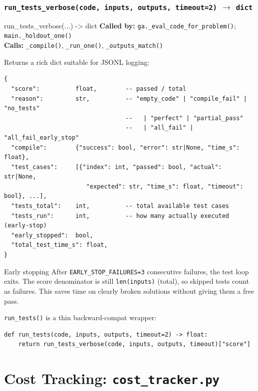 \documentclass[11pt,a4paper]{report}
\newcommand{\pyfile}[1]{\texttt{#1}}
\newcommand{\fn}[1]{\texttt{#1}}
\begin{document}
\subsection{\fn{run\_tests\_verbose(code, inputs, outputs, timeout=2)} $\to$ \fn{dict}}

\begin{specbox}{run\_tests\_verbose(...) -> dict}
\textbf{Called by:} \fn{ga.\_eval\_code\_for\_problem()}; \fn{main.\_holdout\_one()}\\
\textbf{Calls:} \fn{\_compile()}, \fn{\_run\_one()}, \fn{\_outputs\_match()}
\end{specbox}

Returns a rich dict suitable for JSONL logging:
\begin{lstlisting}[style=chain]
{
  "score":          float,        -- passed / total
  "reason":         str,          -- "empty_code" | "compile_fail" | "no_tests"
                                  --   | "perfect" | "partial_pass"
                                  --   | "all_fail" | "all_fail_early_stop"
  "compile":        {"success": bool, "error": str|None, "time_s": float},
  "test_cases":     [{"index": int, "passed": bool, "actual": str|None,
                       "expected": str, "time_s": float, "timeout": bool}, ...],
  "tests_total":    int,          -- total available test cases
  "tests_run":      int,          -- how many actually executed (early-stop)
  "early_stopped":  bool,
  "total_test_time_s": float,
}
\end{lstlisting}

\begin{conceptbox}{Early stopping}
After \fn{EARLY\_STOP\_FAILURES=3} consecutive failures, the test loop exits.
The score denominator is still \fn{len(inputs)} (total), so skipped tests count as
failures.  This saves time on clearly broken solutions without giving them a free pass.
\end{conceptbox}

\fn{run\_tests()} is a thin backward-compat wrapper:
\begin{lstlisting}[style=example]
def run_tests(code, inputs, outputs, timeout=2) -> float:
    return run_tests_verbose(code, inputs, outputs, timeout)["score"]
\end{lstlisting}


\chapter{Cost Tracking: \pyfile{cost\_tracker.py}}
\end{document}
